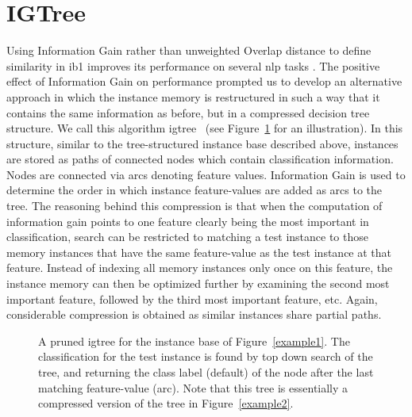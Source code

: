 \documentclass{report}
\begin{document}
\section{IGTree}
\label{igtree}

Using Information Gain rather than unweighted Overlap distance to
define similarity in {\sc ib1} improves its performance on several
{\sc nlp} tasks \cite{Daelemans+92b,VandenBosch+93,VandenBosch97}.
The positive effect of Information Gain on performance prompted us to
develop an alternative approach in which the instance memory is
restructured in such a way that it contains the same information as
before, but in a compressed decision tree structure. We call this
algorithm {\sc igtree}~\cite{Daelemans+97} (see Figure~\ref{example3}
for an illustration). In this structure, similar to the
tree-structured instance base described above, instances are stored as
paths of connected nodes which contain classification
information. Nodes are connected via arcs denoting feature
values. Information Gain is used to determine the order in which
instance feature-values are added as arcs to the tree. The reasoning
behind this compression is that when the computation of information
gain points to one feature clearly being the most important in
classification, search can be restricted to matching a test instance
to those memory instances that have the same feature-value as the test
instance at that feature. Instead of indexing all memory instances
only once on this feature, the instance memory can then be optimized
further by examining the second most important feature, followed by
the third most important feature, etc.  Again, considerable
compression is obtained as similar instances share partial paths.

\begin{figure}[htb]
        \begin{center}
                \leavevmode
                \columnwidth
                \caption{A pruned {\sc igtree} for the instance base
                of Figure~\ref{example1}. The classification for
                the test instance is found by top down search of the
                tree, and returning the class label (default) of the
                node after the last matching feature-value (arc). Note
                that this tree is essentially a compressed version of
                the tree in Figure~\ref{example2}.
                }
                \label{example3}
        \end{center}
\end{figure}
\end{document}
